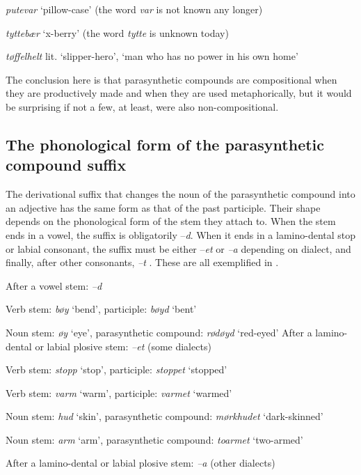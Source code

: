 \documentclass[output=paper]{LSP/langsci}
\begin{document}
\ea%
    \label{ex:bondi:11} 

\textit{putevar} ‘pillow-case’ (the word \textit{var} is not known any longer)

\textit{tyttebær} ‘x-berry’ (the word \textit{tytte} is unknown today)

\textit{tøffelhelt} lit. ‘slipper-hero', ‘man who has no power in his own home’
\z

The conclusion here is that parasynthetic compounds are compositional when they are productively made and when they are used metaphorically, but it would be surprising if not a few, at least, were also non-compositional.  

\subsection{The phonological form of the parasynthetic compound suffix}

The derivational suffix that changes the noun of the parasynthetic compound into an adjective has the same form as that of the past participle. Their shape depends on the phonological form of the stem they attach to.  When the stem ends in a vowel, the suffix is obligatorily –\textit{d}. When it ends in a lamino-dental stop or labial consonant, the suffix must be either –\textit{et} or \textit{–a} depending on dialect, and finally, after other consonants, \textit{–t} . These are all exemplified in .

\newpage 
\ea%
    \label{ex:bondi:12}
   
\ea After a vowel stem: \textit{–d}

Verb stem: \textit{bøy} ‘bend’, participle: \textit{bøyd} ‘bent’

Noun stem: \textit{øy} ‘eye’, parasynthetic compound: \textit{rødøyd} ‘red-eyed’
\ea After a lamino-dental or labial plosive stem: \textit{–et} (some dialects)

Verb stem: \textit{stopp} ‘stop’, participle: \textit{stoppet} ‘stopped’

Verb stem: \textit{varm} ‘warm’, participle: \textit{varmet} ‘warmed’

Noun stem: \textit{hud} ‘skin’, parasynthetic compound: \textit{mørkhudet} `dark-skinned’

Noun stem: \textit{arm} ‘arm’, parasynthetic compound:  \textit{toarmet} ‘two-armed’

\ex After a lamino-dental or labial plosive stem: \textit{–a} (other dialects)
\end{document}
